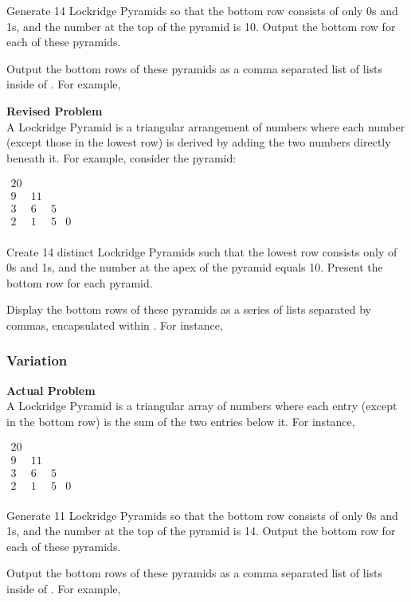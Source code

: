Generate 14 Lockridge Pyramids so that the bottom row consists of only 0s and 1s, and the number at the top of the pyramid is 10. Output the bottom row for each of these pyramids.

Output the bottom rows of these pyramids as a comma separated list of lists inside of . For example, 

\textbf{Revised Problem}\\
A Lockridge Pyramid is a triangular arrangement of numbers where each number (except those in the lowest row) is derived by adding the two numbers directly beneath it. For example, consider the pyramid:

$\begin{array}{cccc}
    20 \\
    9 & 11 \\
    3 &  6 & 5 \\
    2 &  1 & 5 & 0 \\
\end{array}$

Create 14 distinct Lockridge Pyramids such that the lowest row consists only of 0s and 1s, and the number at the apex of the pyramid equals 10. Present the bottom row for each pyramid.

Display the bottom rows of these pyramids as a series of lists separated by commas, encapsulated within . For instance, 

\subsubsection{Variation}
\textbf{Actual Problem}\\
A Lockridge Pyramid is a triangular array of numbers where each entry (except in the bottom row) is the sum of the two entries below it. For instance,

$\begin{array}{cccc}
    20 \\
    9 & 11 \\
    3 &  6 & 5 \\
    2 &  1 & 5 & 0 \\
\end{array}$

Generate 11 Lockridge Pyramids so that the bottom row consists of only 0s and 1s, and the number at the top of the pyramid is 14. Output the bottom row for each of these pyramids.

Output the bottom rows of these pyramids as a comma separated list of lists inside of . For example, 

